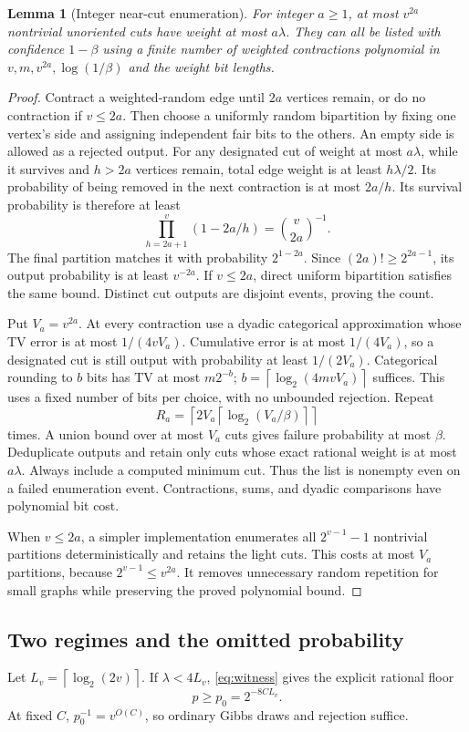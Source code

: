 \documentclass[11pt]{article}
\newtheorem{lemma}[theorem]{Lemma}
\newcommand{\ceil}[1]{\left\lceil #1\right\rceil}
\begin{document}
\begin{lemma}[Integer near-cut enumeration]
For integer $a\ge1$, at most $v^{2a}$ nontrivial unoriented cuts have weight at most $a\lambda$. They can all be listed with confidence $1-\beta$ using a finite number of weighted contractions polynomial in $v,m,v^{2a},\log(1/\beta)$ and the weight bit lengths.
\end{lemma}
\begin{proof}
Contract a weighted-random edge until $2a$ vertices remain, or do no contraction if $v\le2a$. Then choose a uniformly random bipartition by fixing one vertex's side and assigning independent fair bits to the others. An empty side is allowed as a rejected output. For any designated cut of weight at most $a\lambda$, while it survives and $h>2a$ vertices remain, total edge weight is at least $h\lambda/2$. Its probability of being removed in the next contraction is at most $2a/h$. Its survival probability is therefore at least
\[
 \prod_{h=2a+1}^v(1-2a/h)=\binom v{2a}^{-1}.
\]
The final partition matches it with probability $2^{1-2a}$. Since $(2a)!\ge2^{2a-1}$, its output probability is at least $v^{-2a}$. If $v\le2a$, direct uniform bipartition satisfies the same bound. Distinct cut outputs are disjoint events, proving the count.

Put $V_a=v^{2a}$. At every contraction use a dyadic categorical approximation whose TV error is at most $1/(4vV_a)$. Cumulative error is at most $1/(4V_a)$, so a designated cut is still output with probability at least $1/(2V_a)$. Categorical rounding to $b$ bits has TV at most $m2^{-b}$; $b=\ceil{\log_2(4mvV_a)}$ suffices. This uses a fixed number of bits per choice, with no unbounded rejection. Repeat
\[
 R_a=\ceil{2V_a\ceil{\log_2(V_a/\beta)}}
\]
times. A union bound over at most $V_a$ cuts gives failure probability at most $\beta$. Deduplicate outputs and retain only cuts whose exact rational weight is at most $a\lambda$. Always include a computed minimum cut. Thus the list is nonempty even on a failed enumeration event. Contractions, sums, and dyadic comparisons have polynomial bit cost.

When $v\le2a$, a simpler implementation enumerates all $2^{v-1}-1$ nontrivial partitions deterministically and retains the light cuts. This costs at most $V_a$ partitions, because $2^{v-1}\le v^{2a}$. It removes unnecessary random repetition for small graphs while preserving the proved polynomial bound.
\end{proof}

\subsection{Two regimes and the omitted probability}
Let $L_v=\ceil{\log_2(2v)}$. If $\lambda<4L_v$, \eqref{eq:witness} gives the explicit rational floor
\begin{equation}
 p\ge p_0=2^{-8CL_v}.
 \label{eq:p0}
\end{equation}
At fixed $C$, $p_0^{-1}=v^{O(C)}$, so ordinary Gibbs draws and rejection suffice.
\end{document}
